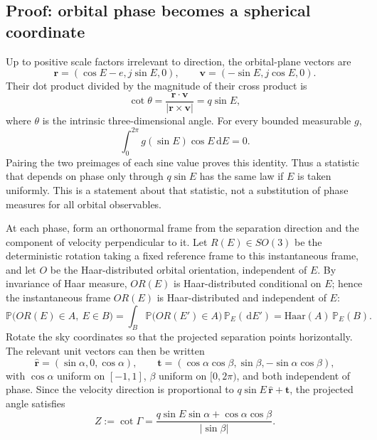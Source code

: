 \documentclass[11pt,a4paper]{article}
\theoremstyle{remark}\newtheorem{remark}[theorem]{Remark}
\newcommand{\Prob}{\mathbb P}
\newcommand{\dd}{\,\mathrm d}
\begin{document}
\subsection{Proof: orbital phase becomes a spherical coordinate}

Up to positive scale factors irrelevant to direction, the orbital-plane vectors are
\begin{equation}
\bm r=(\cos E-e,j\sin E,0),\qquad
\bm v=(-\sin E,j\cos E,0).
\end{equation}
Their dot product divided by the magnitude of their cross product is
\begin{equation}\label{eq:intrinsiccot}
\cot\theta=\frac{\bm r\cdot\bm v}{|\bm r\times\bm v|}=q\sin E,
\end{equation}
where $\theta$ is the intrinsic three-dimensional angle. For every bounded measurable $g$,
\begin{equation}\label{eq:phasepair}
\int_0^{2\pi}g(\sin E)\cos E\dd E=0.
\end{equation}
Pairing the two preimages of each sine value proves this identity. Thus a statistic that depends on phase only through $q\sin E$ has the same law if $E$ is taken uniformly. This is a statement about that statistic, not a substitution of phase measures for all orbital observables.

At each phase, form an orthonormal frame from the separation direction and the component of velocity perpendicular to it. Let $R(E)\in SO(3)$ be the deterministic rotation taking a fixed reference frame to this instantaneous frame, and let $O$ be the Haar-distributed orbital orientation, independent of $E$. By invariance of Haar measure, $OR(E)$ is Haar-distributed conditional on $E$; hence the instantaneous frame $OR(E)$ is Haar-distributed and independent of $E$:
\begin{equation}
\Prob\big(OR(E)\in A,\ E\in B\big)=\int_B\Prob\big(OR(E')\in A\big)\,\Prob_E(\dd E')=\mathrm{Haar}(A)\,\Prob_E(B).
\end{equation}
Rotate the sky coordinates so that the projected separation points horizontally. The relevant unit vectors can then be written
\begin{equation}
\widehat{\bm r}=(\sin\alpha,0,\cos\alpha),\qquad
\bm t=(\cos\alpha\cos\beta,\sin\beta,-\sin\alpha\cos\beta),
\end{equation}
with $\cos\alpha$ uniform on $[-1,1]$, $\beta$ uniform on $[0,2\pi)$, and both independent of phase. Since the velocity direction is proportional to $q\sin E\,\widehat{\bm r}+\bm t$, the projected angle satisfies
\begin{equation}\label{eq:cotprojected}
Z:=\cot\Gamma=
\frac{q\sin E\sin\alpha+\cos\alpha\cos\beta}{|\sin\beta|}.
\end{equation}
\end{document}

